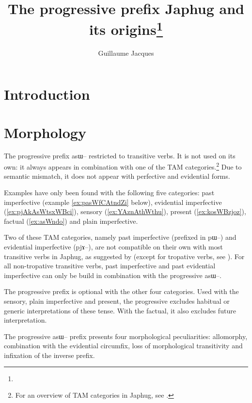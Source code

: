 \documentclass[oldfontcommands,oneside,a4paper,11pt]{article}
\newcommand{\ipa}[1]{{\phon \mbox{#1}}} %
\begin{document}
 
\title{The progressive prefix Japhug and its origins\footnote{
} }
\author{Guillaume Jacques}
\maketitle
\linenumbers

\section{Introduction}


\section{Morphology}

The progressive prefix \ipa{asɯ--} restricted to transitive verbs. It is not used on its own: it always appears in combination with one of the TAM categories.\footnote{For an overview of TAM categories in Japhug, see \citealt{jacques14linking}.} Due to semantic mismatch, it does not appear with perfective and evidential forms.

Examples have only been found with the following five categories: past imperfective (example \ref{ex:pasWfCAtndZi} below), evidential imperfective (\ref{ex:pjAkAsWtsxWBci}), sensory (\ref{ex:YAznAthWthu}), present (\ref{ex:kosWBzjoz}), factual (\ref{ex:asWndo}) and plain imperfective. 

Two of these TAM categories, namely past imperfective (prefixed in \ipa{pɯ--}) and evidential imperfective (\ipa{pjɤ--}), are not compatible on their own with most transitive verbs in Japhug, as suggested by \citet{lin11direction} (except for tropative verbs, see \citealt{jacques13tropative}). For all non-tropative transitive verbs, past imperfective and past evidential imperfective can only be build in combination with the progressive \ipa{asɯ--}. 

The progressive prefix is optional with the other four categories. Used with the sensory, plain imperfective and present, the progressive excludes habitual or generic interpretations of these tense. With the factual, it also excludes future interpretation.

The progressive \ipa{asɯ--} prefix presents four morphological peculiarities: allomorphy, combination with the evidential circumfix, loss of morphological transitivity and infixation of the inverse prefix.
\end{document}
